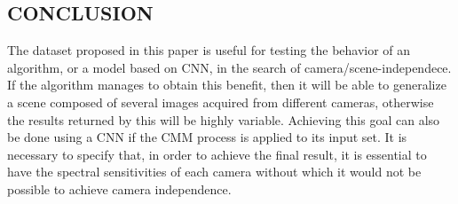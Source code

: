 \subsection{CONCLUSION}
The dataset proposed in this paper is useful for testing the behavior of an algorithm, or a model based on CNN, in the search of camera/scene-independece. If the algorithm manages to obtain this benefit, then it will be able to generalize a scene composed of several images acquired from different cameras, otherwise the results returned by this will be highly variable. Achieving this goal can also be done using a CNN if the CMM process is applied to its input set. It is necessary to specify that, in order to achieve the final result, it is essential to have the spectral sensitivities of each camera without which it would not be possible to achieve camera independence.